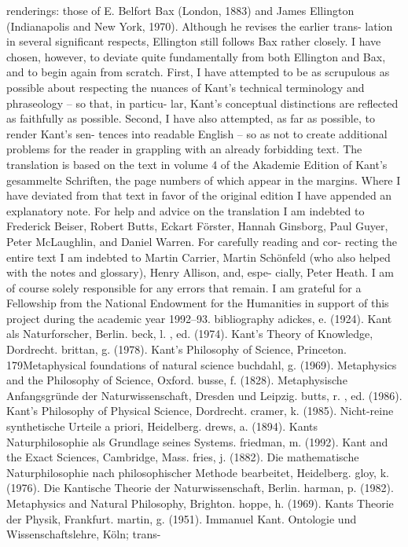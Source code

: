 renderings: those of E. Belfort Bax (London, 1883) and James Ellington
(Indianapolis and New York, 1970). Although he revises the earlier trans-
lation in several signiﬁcant respects, Ellington still follows Bax rather
closely. I have chosen, however, to deviate quite fundamentally from
both Ellington and Bax, and to begin again from scratch. First, I have
attempted to be as scrupulous as possible about respecting the nuances
of Kant’s technical terminology and phraseology – so that, in particu-
lar, Kant’s conceptual distinctions are reﬂected as faithfully as possible.
Second, I have also attempted, as far as possible, to render Kant’s sen-
tences into readable English – so as not to create additional problems
for the reader in grappling with an already forbidding text.
The translation is based on the text in volume 4 of the Akademie
Edition of Kant’s gesammelte Schriften, the page numbers of which appear
in the margins. Where I have deviated from that text in favor of the
original edition I have appended an explanatory note.
For help and advice on the translation I am indebted to Frederick
Beiser, Robert Butts, Eckart Förster, Hannah Ginsborg, Paul Guyer,
Peter McLaughlin, and Daniel Warren. For carefully reading and cor-
recting the entire text I am indebted to Martin Carrier, Martin Schönfeld
(who also helped with the notes and glossary), Henry Allison, and, espe-
cially, Peter Heath. I am of course solely responsible for any errors that
remain.
I am grateful for a Fellowship from the National Endowment for the
Humanities in support of this project during the academic year 1992–93.
bibliography
adickes, e. (1924). Kant als Naturforscher, Berlin.
beck, l. , ed. (1974). Kant’s Theory of Knowledge, Dordrecht.
brittan, g. (1978). Kant’s Philosophy of Science, Princeton.
179Metaphysical foundations of natural science
buchdahl, g. (1969). Metaphysics and the Philosophy of Science, Oxford.
busse, f. (1828). Metaphysische Anfangsgründe der Naturwissenschaft, Dresden
und Leipzig.
butts, r. , ed. (1986). Kant’s Philosophy of Physical Science, Dordrecht.
cramer, k. (1985). Nicht-reine synthetische Urteile a priori, Heidelberg.
drews, a. (1894). Kants Naturphilosophie als Grundlage seines Systems.
friedman, m. (1992). Kant and the Exact Sciences, Cambridge, Mass.
fries, j. (1882). Die mathematische Naturphilosophie nach philosophischer Methode
bearbeitet, Heidelberg.
gloy, k. (1976). Die Kantische Theorie der Naturwissenschaft, Berlin.
harman, p. (1982). Metaphysics and Natural Philosophy, Brighton.
hoppe, h. (1969). Kants Theorie der Physik, Frankfurt.
martin, g. (1951). Immanuel Kant. Ontologie und Wissenschaftslehre, Köln; trans-
